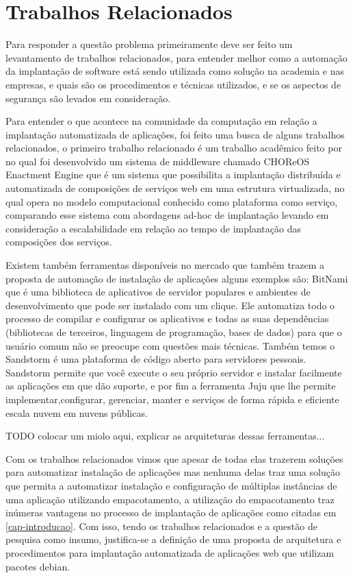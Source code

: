 \section{Trabalhos Relacionados}

Para responder a questão problema primeiramente deve ser feito um levantamento
de trabalhos relacionados, para entender melhor como a automação da implantação
de software está sendo utilizada como solução na academia e nas empresas, e
quais são os procedimentos e técnicas utilizados, e se os aspectos de segurança
são levados em consideração.

Para entender o que acontece na comunidade da computação em relação a implantação
automatizada de aplicações, foi feito uma busca de alguns trabalhos relacionados, o primeiro
trabalho relacionado é um trabalho acadêmico feito por \cite{leo2014} no qual foi
desenvolvido um sistema de middleware chamado CHOReOS Enactment Engine que é um
sistema que possibilita a implantação distribuída e automatizada de composições
de serviços web em uma estrutura virtualizada, no qual opera no modelo
computacional conhecido como plataforma como serviço, comparando esse sistema
com abordagens ad-hoc de implantação levando em consideração a escalabilidade
em relação ao tempo de implantação das composições dos serviços.

Existem também ferramentas disponíveis no mercado que também trazem a proposta
de automação de instalação de aplicações alguns exemplos são: \cite{bitnami}
BitNami que é uma biblioteca de aplicativos de servidor populares e ambientes de
desenvolvimento que pode ser instalado com um clique. Ele automatiza todo o
processo de compilar e configurar os aplicativos e todas as suas dependências
(bibliotecas de terceiros, linguagem de programação, bases de dados) para que o
usuário comum não se preocupe com questões mais técnicas. Também temos o
\cite{sandstormio} Sandstorm é uma plataforma de código aberto para servidores
pessoais. Sandstorm permite que você execute o seu próprio servidor e instalar
facilmente as aplicações em que dão suporte, e por fim a ferramenta \cite{juju}
Juju que lhe permite implementar,configurar, gerenciar, manter e serviços de forma
rápida e eficiente escala nuvem em nuvens públicas.

TODO colocar um miolo aqui, explicar as arquiteturas dessas ferramentas...

Com os trabalhos relacionados vimos que apesar de todas elas trazerem soluções
para automatizar instalação de aplicações mas nenhuma delas traz uma solução que
permita a automatizar instalação e configuração de múltiplas instâncias de uma aplicação
utilizando empacotamento, a utilização do empacotamento traz inúmeras vantagens
no processo de implantação de aplicações como citadas em \ref{cap-introducao}.
Com isso, tendo os trabalhos relacionados e a questão de pesquisa como insumo,
justifica-se a definição de uma proposta de arquitetura e procedimentos para
implantação automatizada de aplicações web que utilizam pacotes debian.

